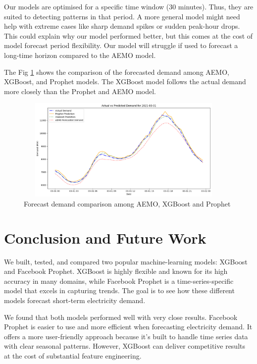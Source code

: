 \documentclass[mstat,12pt]{unswthesis}
\begin{document}
Our models are optimised for a specific time window (30 minutes). Thus,
they are suited to detecting patterns in that period. A more general
model might need help with extreme cases like sharp demand spikes or
sudden peak-hour drops. This could explain why our model performed
better, but this comes at the cost of model forecast period flexibility.
Our model will struggle if used to forecast a long-time horizon compared
to the AEMO model.

The Fig \ref{AEMO_Prophet_XGBoost} shows the comparison of the
forecasted demand among AEMO, XGBoost, and Prophet models. The XGBoost
model follows the actual demand more closely than the Prophet and AEMO
model.

\begin{figure}[H]
\centering
\includegraphics[width=0.95\textwidth, height=5cm]{AEMO_Prophet_XGBoost.png}
\caption{Forecast demand comparison among AEMO, XGBoost and Prophet}\label{AEMO_Prophet_XGBoost}
\end{figure}

\chapter{Conclusion and Future Work}\label{conclusion-and-future-work}

We built, tested, and compared two popular machine-learning models:
XGBoost and Facebook Prophet. XGBoost is highly flexible and known for
its high accuracy in many domains, while Facebook Prophet is a
time-series-specific model that excels in capturing trends. The goal is
to see how these different models forecast short-term electricity
demand.

We found that both models performed well with very close results.
Facebook Prophet is easier to use and more efficient when forecasting
electricity demand. It offers a more user-friendly approach because it's
built to handle time series data with clear seasonal patterns. However,
XGBoost can deliver competitive results at the cost of substantial
feature engineering.
\end{document}
